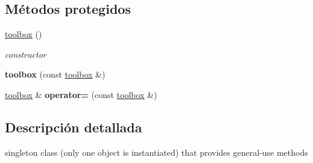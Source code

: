 \subsection*{Métodos protegidos}
\begin{DoxyCompactItemize}
\item 
\hypertarget{classtoolbox_ae52c33dc9f80c6ce0208a70abde2418e}{\hyperlink{classtoolbox_ae52c33dc9f80c6ce0208a70abde2418e}{toolbox} ()}\label{classtoolbox_ae52c33dc9f80c6ce0208a70abde2418e}

\begin{DoxyCompactList}\small\item\em constructor \end{DoxyCompactList}\item 
\hypertarget{classtoolbox_a384cba887600d141b5c19ada2448522e}{{\bfseries toolbox} (const \hyperlink{classtoolbox}{toolbox} \&)}\label{classtoolbox_a384cba887600d141b5c19ada2448522e}

\item 
\hypertarget{classtoolbox_a22f47dcb9fdf470e56c16c3851a58f7a}{\hyperlink{classtoolbox}{toolbox} \& {\bfseries operator=} (const \hyperlink{classtoolbox}{toolbox} \&)}\label{classtoolbox_a22f47dcb9fdf470e56c16c3851a58f7a}

\end{DoxyCompactItemize}


\subsection{Descripción detallada}
singleton class (only one object is instantiated) that provides general-\/use methods 

